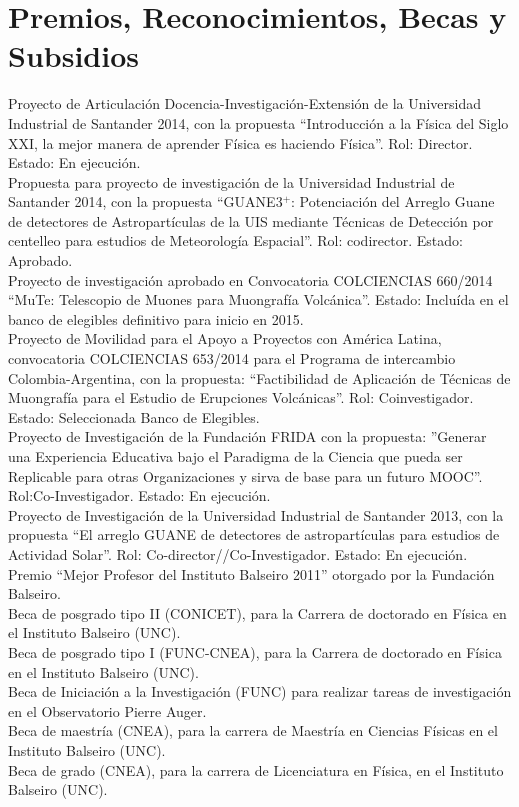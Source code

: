 \section*{Premios, Reconocimientos, Becas y Subsidios}
\noindent
{} Proyecto de Articulación Docencia-Investigación-Extensión de la Universidad Industrial de Santander 2014, con la propuesta ``Introducción a la Física del Siglo XXI, la mejor manera de aprender Física es haciendo Física''. Rol: Director. Estado: En ejecución.\\
 Propuesta para proyecto de investigación de la Universidad Industrial de Santander 2014, con la propuesta ``GUANE3$^+$: Potenciación del Arreglo Guane de detectores de Astropartículas de la UIS mediante Técnicas de Detección por centelleo para estudios de Meteorología Espacial''. Rol: codirector. Estado: Aprobado.\\
 Proyecto de investigación aprobado en Convocatoria COLCIENCIAS 660/2014 ``MuTe: Telescopio de Muones para Muongrafía Volcánica''. Estado: Incluída en el banco de elegibles definitivo para inicio en 2015.\\
 Proyecto de Movilidad para el Apoyo a Proyectos con América Latina, convocatoria COLCIENCIAS 653/2014 para el Programa de intercambio Colombia-Argentina, con la propuesta: ``Factibilidad de Aplicación de Técnicas de Muongrafía para el Estudio de Erupciones Volcánicas''. Rol: Coinvestigador. Estado: Seleccionada Banco de Elegibles.\\
 Proyecto de Investigación de la Fundación FRIDA con la propuesta: ''Generar una Experiencia Educativa bajo el Paradigma de la Ciencia que pueda ser Replicable para otras Organizaciones y sirva de base para un futuro MOOC''. Rol:Co-Investigador. Estado: En ejecución.\\
 Proyecto de Investigación de la Universidad Industrial de Santander 2013, con la propuesta ``El arreglo GUANE de detectores de astropartículas para estudios de Actividad Solar''. Rol: Co-director//Co-Investigador. Estado: En ejecución.\\
Premio ``Mejor Profesor del Instituto Balseiro 2011'' otorgado por la Fundación Balseiro.\\
Beca de posgrado tipo II (CONICET), para la Carrera de doctorado en Física en el Instituto Balseiro (UNC).\\
Beca de posgrado tipo I (FUNC-CNEA), para la Carrera de doctorado en Física en el Instituto Balseiro (UNC).\\
Beca de Iniciación a la Investigación (FUNC) para realizar tareas de investigación en el Observatorio Pierre Auger.\\
Beca de maestría (CNEA), para la carrera de Maestría en Ciencias Físicas en el Instituto Balseiro (UNC).\\
Beca de grado (CNEA), para la carrera de Licenciatura en Física, en el Instituto Balseiro (UNC).
\fi
